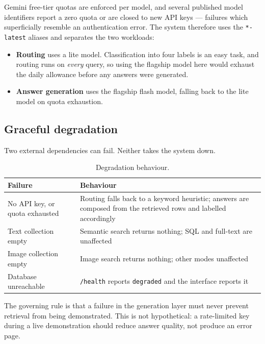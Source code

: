 \documentclass[11pt,a4paper]{article}
\begin{document}
Gemini free-tier quotas are enforced per model, and several published model
identifiers report a zero quota or are closed to new API keys --- failures which
superficially resemble an authentication error. The system therefore uses the
\texttt{*-latest} aliases and separates the two workloads:

\begin{itemize}[itemsep=2pt]
  \item \textbf{Routing} uses a lite model. Classification into four labels is
        an easy task, and routing runs on \emph{every} query, so using the
        flagship model here would exhaust the daily allowance before any answers
        were generated.
  \item \textbf{Answer generation} uses the flagship flash model, falling back
        to the lite model on quota exhaustion.
\end{itemize}

\subsection{Graceful degradation}

Two external dependencies can fail. Neither takes the system down.

\begin{table}[h]
\centering
\small
\begin{tabular}{lp{8.6cm}}
\toprule
\textbf{Failure} & \textbf{Behaviour} \\
\midrule
No API key, or quota exhausted & Routing falls back to a keyword heuristic; answers are composed from the retrieved rows and labelled accordingly \\
Text collection empty          & Semantic search returns nothing; SQL and full-text are unaffected \\
Image collection empty         & Image search returns nothing; other modes unaffected \\
Database unreachable           & \texttt{/health} reports \texttt{degraded} and the interface reports it \\
\bottomrule
\end{tabular}
\caption{Degradation behaviour.}
\end{table}

The governing rule is that a failure in the generation layer must never prevent
retrieval from being demonstrated. This is not hypothetical: a rate-limited key
during a live demonstration should reduce answer quality, not produce an error
page.
\end{document}
